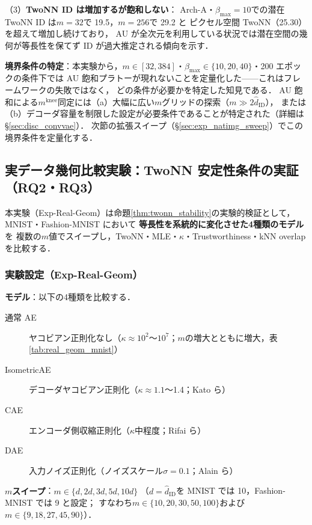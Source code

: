 \documentclass[11pt,a4paper]{jsarticle}
\newcommand{\kap}{\kappa}
\newcommand{\mknee}{m^{\mathrm{knee}}}
\begin{document}
（3）\textbf{TwoNN ID は増加するが飽和しない}：
Arch-A・$\beta_{\max}=10$での潜在 TwoNN ID は$m=32$で 19.5，$m=256$で 29.2 と
ピクセル空間 TwoNN（25.30）を超えて増加し続けており，
AU が全次元を利用している状況では潜在空間の幾何が等長性を保てず ID が過大推定される傾向を示す．

\textbf{境界条件の特定}：本実験から，$m \in [32, 384]$・$\beta_{\max} \in \{10, 20, 40\}$・200 エポックの条件下では
AU 飽和プラトーが現れないことを定量化した——これはフレームワークの失敗ではなく，
どの条件が必要かを特定した知見である．
AU 飽和による$\mknee$同定には（a）大幅に広い$m$グリッドの探索（$m \gg 2\hat{d}_\mathrm{ID}$），
または（b）デコーダ容量を制限した設定が必要条件であることが特定された（詳細は§\ref{sec:disc_convvae}）．
次節の拡張スイープ（§\ref{sec:exp_natimg_sweep}）でこの境界条件を定量化する．

\subsection{実データ幾何比較実験：TwoNN 安定性条件の実証（RQ2・RQ3）}\label{sec:exp_real_geom}

本実験（Exp-Real-Geom）は命題\ref{thm:twonn_stability}の実験的検証として，
MNIST・Fashion-MNIST において \textbf{等長性を系統的に変化させた4種類のモデル}を
複数の$m$値でスイープし，TwoNN・MLE・$\kap$・Trustworthiness・kNN overlap を比較する．

\subsubsection*{実験設定（Exp-Real-Geom）}

\textbf{モデル}：以下の4種類を比較する．
\begin{description}
  \item[通常 AE] ヤコビアン正則化なし（$\kap \approx 10^2$〜$10^7$；$m$の増大とともに増大，表\ref{tab:real_geom_mnist}）
  \item[IsometricAE] デコーダヤコビアン正則化（$\kap \approx 1.1$〜1.4；Kato ら\cite{kato2020rdae}）
  \item[CAE] エンコーダ側収縮正則化（$\kap$中程度；Rifai ら\cite{rifai2011cae}）
  \item[DAE] 入力ノイズ正則化（ノイズスケール$\sigma=0.1$；Alain ら\cite{alain2014dae}）
\end{description}

\textbf{$m$スイープ}：$m \in \{d, 2d, 3d, 5d, 10d\}$
（$d = \hat{d}_\mathrm{ID}$を MNIST では 10，Fashion-MNIST では 9 と設定；
すなわち$m \in \{10, 20, 30, 50, 100\}$および$m \in \{9, 18, 27, 45, 90\}$）．
\end{document}
